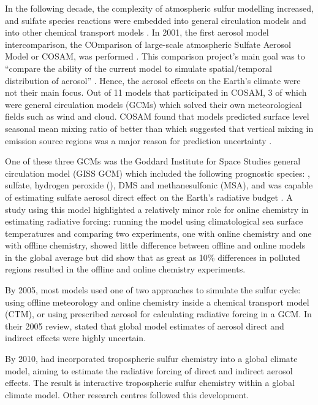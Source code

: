 In the following decade, the complexity of atmospheric sulfur modelling increased, and sulfate species reactions were embedded into general circulation models and into other chemical transport models \citep[e.g.][]{kochTroposphericSulfurSimulation1999}.  In 2001, the first aerosol model intercomparison, the COmparison of large-scale atmospheric Sulfate Aerosol Model or COSAM, was performed  \citep{barrieComparisonLargescaleAtmospheric2001, lohmannVerticalDistributionsSulfur2001, roelofsAnalysisRegionalBudgets2001}. This comparison project’s main goal was to “compare the ability of the current model to simulate spatial/temporal distribution of aerosol” \citep{barrieComparisonLargescaleAtmospheric2001}. Hence, the aerosol effects on the Earth’s climate were not their main focus.  Out of 11 models that participated in COSAM, 3 of which were general circulation models (GCMs) which solved their own meteorological fields such as wind and cloud. COSAM found that models predicted surface level seasonal mean mixing ratio of  better than  which suggested that vertical mixing in emission source regions was a major reason for prediction uncertainty \citep{lohmannVerticalDistributionsSulfur2001}. 

One of these three GCMs was the Goddard Institute for Space Studies general circulation model (GISS GCM) which included the following prognostic species: , sulfate, hydrogen peroxide (), DMS and methanesulfonic (MSA), and was capable of estimating sulfate aerosol direct effect on the Earth’s radiative budget \citep{kochTroposphericSulfurSimulation1999}. A study using this model highlighted a relatively minor role for online chemistry in estimating radiative forcing: running the model using climatological sea surface temperatures and comparing two experiments, one with online chemistry and one with offline chemistry, showed little difference between offline and online models in the global average but did show that as great as 10\% differences in polluted regions resulted in the offline and online chemistry experiments.

By 2005, most models used one of two approaches to simulate the sulfur cycle: using offline meteorology and online chemistry inside a chemical transport model (CTM), or using prescribed aerosol for calculating radiative forcing in a GCM.  In their 2005 review, \citet{lohmannGlobalIndirectAerosol2005} stated that global model estimates of aerosol direct and indirect effects were highly uncertain. 

By 2010, \citet{tsaiSulfurCycleSulfate2010} had incorporated tropospheric sulfur chemistry into a global climate model, aiming to estimate the radiative forcing of direct and indirect aerosol effects. The result is interactive tropospheric sulfur chemistry within a global climate model. Other research centres followed this development.

